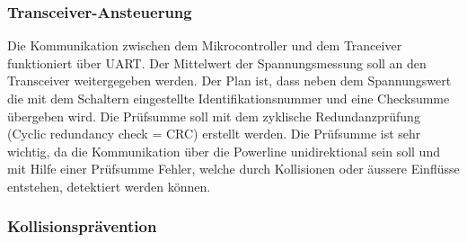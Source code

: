 \subsubsection{Transceiver-Ansteuerung}
Die Kommunikation zwischen dem Mikrocontroller und dem Tranceiver funktioniert über UART. 
Der Mittelwert der Spannungsmessung soll an den Transceiver weitergegeben werden. Der Plan ist, dass neben dem Spannungswert die mit dem Schaltern eingestellte Identifikationsnummer und eine Checksumme übergeben wird. Die Prüfsumme soll mit dem zyklische Redundanzprüfung (Cyclic redundancy check = CRC)  erstellt werden. Die Prüfsumme ist sehr wichtig, da die Kommunikation über die Powerline unidirektional sein soll und  mit Hilfe einer Prüfsumme Fehler, welche durch Kollisionen oder äussere Einflüsse entstehen, detektiert werden können.

\subsubsection{Kollisionsprävention}
















